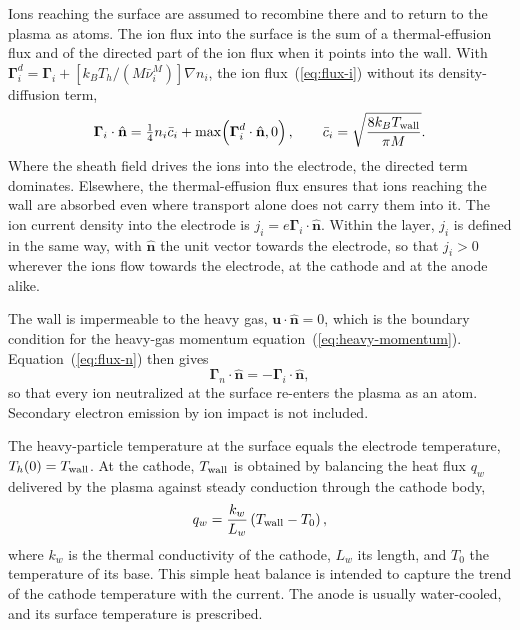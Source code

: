 Ions reaching the surface are assumed to recombine there and to return to the plasma as atoms. The ion flux into the surface is the sum of a thermal-effusion flux and of the directed part of the ion flux when it points into the wall. With \(\boldsymbol{\Gamma}_i^{d}=\boldsymbol{\Gamma}_i+[k_BT_h/(M\bar\nu^M_i)]\nabla n_i\), the ion flux~(\ref{eq:flux-i}) without its density-diffusion term,
\begin{equation}
\boldsymbol{\Gamma}_i\cdot\hat{\mathbf{n}}=
\tfrac14n_i\bar c_i+\max\!\left(\boldsymbol{\Gamma}_i^{d}\cdot\hat{\mathbf{n}},0\right),
\qquad
\bar c_i=\sqrt{\frac{8k_BT_{\rm wall}}{\pi M}} .
\label{eq:bc-ion}
\end{equation}
Where the sheath field drives the ions into the electrode, the directed term dominates. Elsewhere, the thermal-effusion flux ensures that ions reaching the wall are absorbed even where transport alone does not carry them into it. The ion current density into the electrode is \(j_i=e\boldsymbol{\Gamma}_i\cdot\hat{\mathbf{n}}\). Within the layer, \(j_i\) is defined in the same way, with \(\hat{\mathbf{n}}\) the unit vector towards the electrode, so that \(j_i>0\) wherever the ions flow towards the electrode, at the cathode and at the anode alike.

The wall is impermeable to the heavy gas, \(\mathbf{u}\cdot\hat{\mathbf{n}}=0\), which is the boundary condition for the heavy-gas momentum equation~(\ref{eq:heavy-momentum}). Equation~(\ref{eq:flux-n}) then gives
\begin{equation}
\boldsymbol{\Gamma}_n\cdot\hat{\mathbf{n}}=-\boldsymbol{\Gamma}_i\cdot\hat{\mathbf{n}} ,
\label{eq:bc-neutral}
\end{equation}
so that every ion neutralized at the surface re-enters the plasma as an atom. Secondary electron emission by ion impact is not included.

The heavy-particle temperature at the surface equals the electrode temperature, \(T_h(0)=T_{\rm wall}\). At the cathode, \(T_{\rm wall}\) is obtained by balancing the heat flux \(q_w\) delivered by the plasma against steady conduction through the cathode body,
\begin{equation}
q_w=\frac{k_w}{L_w}\left(T_{\rm wall}-T_0\right),
\label{eq:bc-heat-balance}
\end{equation}
where \(k_w\) is the thermal conductivity of the cathode, \(L_w\) its length, and \(T_0\) the temperature of its base. This simple heat balance is intended to capture the trend of the cathode temperature with the current. The anode is usually water-cooled, and its surface temperature is prescribed.

